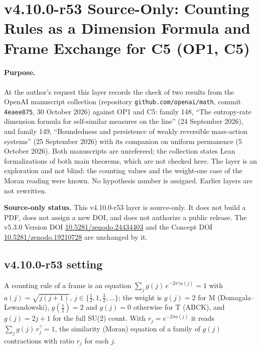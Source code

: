 
\clearpage
\section*{v4.10.0-r53 Source-Only: Counting Rules as a Dimension Formula and Frame Exchange for C5 (OP1, C5)}
\label{sec:v4100-r53-dimension-exchange}

\paragraph{Purpose.}
At the author's request this layer records the check of two results from the OpenAI manuscript collection (repository
\texttt{github.com/openai/math}, commit \texttt{4eaee875}, 30 October 2026) against OP1 and C5: family 148, ``The entropy-rate dimension formula for
self-similar measures on the line'' (24 September 2026), and family 149, ``Boundedness and persistence of weakly reversible mass-action systems''
(25 September 2026) with its companion on uniform permanence (5 October 2026).  Both manuscripts are unrefereed; the collection states Lean
formalizations of both main theorems, which are not checked here.  The layer is an exploration and not blind: the counting values and the
weight-one case of the Moran reading were known.  No hypothesis number is assigned.  Earlier layers are not rewritten.

\noindent\textbf{Source-only status.}
This v4.10.0-r53 layer is source-only.  It does not build a PDF, does not assign a new DOI,
and does not authorize a public release.  The v5.3.0 Version DOI
\href{https://doi.org/10.5281/zenodo.24434403}{10.5281/zenodo.24434403} and the Concept DOI
\href{https://doi.org/10.5281/zenodo.19210728}{10.5281/zenodo.19210728} are unchanged by it.

\subsection*{v4.10.0-r53 setting}
\label{subsec:v4100-r53-setting}

A counting rule of a frame is an equation \(\sum_j g(j)\,e^{-2\pi\gamma a(j)}=1\) with \(a(j)=\sqrt{j(j+1)}\), \(j\in\{\tfrac12,1,\tfrac32,\dots\}\); the weight is
\(g(j)=2\) for M (Domagala--Lewandowski), \(g(\tfrac12)=2\) and \(g(j)=0\) otherwise for T (ABCK), and \(g(j)=2j+1\) for the full SU(2) count.  With
\(r_j=e^{-2\pi a(j)}\) it reads \(\sum_j g(j)\,r_j^{\gamma}=1\), the similarity (Moran) equation of a family of \(g(j)\) contractions with ratio \(r_j\) for each \(j\).

